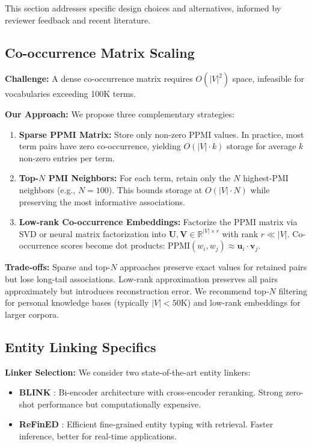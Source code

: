 \documentclass[11pt,a4paper]{article}
\begin{document}
This section addresses specific design choices and alternatives, informed by reviewer feedback and recent literature.

\subsection{Co-occurrence Matrix Scaling}
\label{sec:cooccurrence_scaling}

\textbf{Challenge:} A dense co-occurrence matrix requires $O(|V|^2)$ space, infeasible for vocabularies exceeding 100K terms.

\textbf{Our Approach:} We propose three complementary strategies:

\begin{enumerate}
    \item \textbf{Sparse PPMI Matrix:} Store only non-zero PPMI values. In practice, most term pairs have zero co-occurrence, yielding $O(|V| \cdot k)$ storage for average $k$ non-zero entries per term.
    
    \item \textbf{Top-$N$ PMI Neighbors:} For each term, retain only the $N$ highest-PMI neighbors (e.g., $N = 100$). This bounds storage at $O(|V| \cdot N)$ while preserving the most informative associations.
    
    \item \textbf{Low-rank Co-occurrence Embeddings:} Factorize the PPMI matrix via SVD or neural matrix factorization into $\mathbf{U}, \mathbf{V} \in \mathbb{R}^{|V| \times r}$ with rank $r \ll |V|$. Co-occurrence scores become dot products: $\text{PPMI}(w_i, w_j) \approx \mathbf{u}_i \cdot \mathbf{v}_j$.
\end{enumerate}

\textbf{Trade-offs:} Sparse and top-$N$ approaches preserve exact values for retained pairs but lose long-tail associations. Low-rank approximation preserves all pairs approximately but introduces reconstruction error. We recommend top-$N$ filtering for personal knowledge bases (typically $|V| < 50$K) and low-rank embeddings for larger corpora.

\subsection{Entity Linking Specifics}
\label{sec:entity_linking}

\textbf{Linker Selection:} We consider two state-of-the-art entity linkers:
\begin{itemize}
    \item \textbf{BLINK} \citep{wu2020blink}: Bi-encoder architecture with cross-encoder reranking. Strong zero-shot performance but computationally expensive.
    \item \textbf{ReFinED} \citep{ayoola2022refined}: Efficient fine-grained entity typing with retrieval. Faster inference, better for real-time applications.
\end{itemize}
\end{document}
